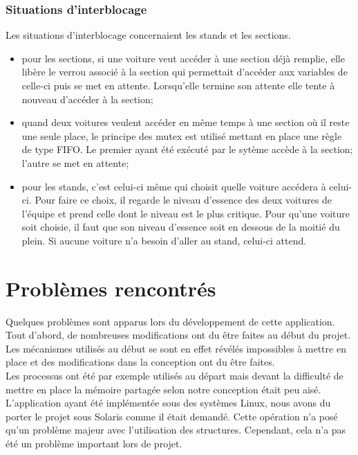 \documentclass[a4paper, 11pt]{report}
\begin{document}
			\subsection{Situations d'interblocage}
			
			Les situations d'interblocage concernaient les stands et les sections. 
			\begin{itemize}
				\item pour les sections, si une voiture veut accéder à une section déjà remplie, elle libère le verrou associé à la section qui permettait d'accéder aux variables de celle-ci puis se met en attente. Lorsqu'elle termine son attente elle tente à nouveau d'accéder à la section;
				\item quand deux voitures veulent accéder en même temps à une section où il reste une seule place, le principe des mutex est utilisé mettant en place une règle de type FIFO. Le premier ayant été exécuté par le sytème accède à la section; l'autre se met en attente;
				\item pour les stands, c'est celui-ci même qui choisit quelle voiture accédera à celui-ci. Pour faire ce choix, il regarde le niveau d'essence des deux voitures de l'équipe et prend celle dont le niveau est le plus critique. Pour qu'une voiture soit choisie, il faut que son niveau d'essence soit en dessous de la moitié du plein. Si aucune voiture n'a besoin d'aller au stand, celui-ci attend.
			\end{itemize}
			

	\chapter{Problèmes rencontrés}
	
	Quelques problèmes sont apparus lors du développement de cette application. \\
	
	Tout d'abord, de nombreuses modifications ont du être faites au début du projet. Les mécanismes utilisés au début se sont en effet révélés impossibles à mettre en place et des modifications dans la conception ont du être faites. \\
	Les processus ont été par exemple utilisés au départ mais devant la difficulté de mettre en place la mémoire partagée selon notre conception était peu aisé.	\\
	
	L'application ayant été implémentée sous des systèmes Linux, nous avons du porter le projet sous Solaris comme il était demandé. Cette opération n'a posé qu'un problème majeur avec l'utilisation des structures. Cependant, cela n'a pas été un problème important lors de projet. \\
	
\end{document}
